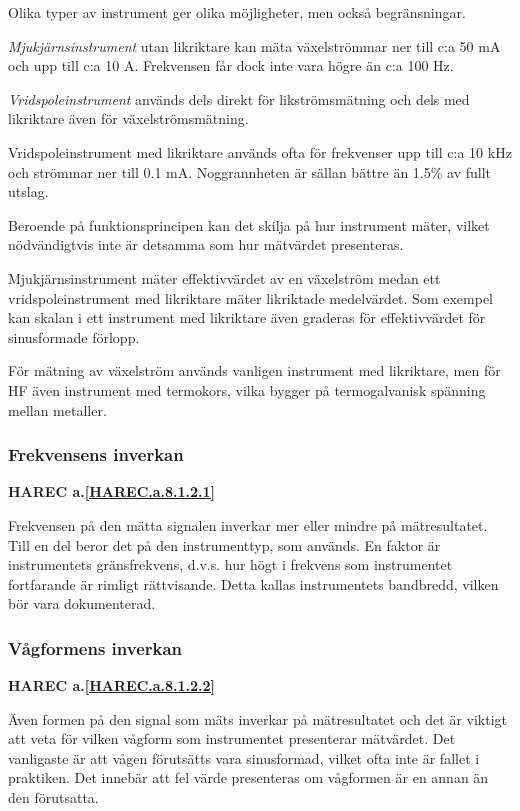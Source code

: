 Olika typer av instrument ger olika möjligheter, men också
begränsningar.

\emph{Mjukjärnsinstrument} utan likriktare kan mäta växelströmmar ner
till c:a 50 mA och upp till c:a 10 A. Frekvensen får dock inte vara
högre än c:a 100 Hz.

\emph{Vridspoleinstrument} används dels direkt för likströmsmätning
och dels med likriktare även för växelströmsmätning.

Vridspoleinstrument med likriktare används ofta för frekvenser upp
till c:a 10 kHz och strömmar ner till 0.1 mA. Noggrannheten är sällan
bättre än 1.5\% av fullt utslag.

Beroende på funktionsprincipen kan det skilja på hur instrument mäter,
vilket nödvändigtvis inte är detsamma som hur mätvärdet presenteras.

Mjukjärnsinstrument mäter effektivvärdet av en växelström medan ett
vridspoleinstrument med likriktare mäter likriktade medelvärdet. Som
exempel kan skalan i ett instrument med likriktare även graderas för
effektivvärdet för sinusformade förlopp.

För mätning av växelström används vanligen instrument med likriktare,
men för HF även instrument med termokors, vilka bygger på
termogalvanisk spänning mellan metaller.

\subsubsection{Frekvensens inverkan}
\textbf{
HAREC a.\ref{HAREC.a.8.1.2.1}\label{myHAREC.a.8.1.2.1}
}

Frekvensen på den mätta signalen inverkar mer eller mindre på
mätresultatet. Till en del beror det på den instrumenttyp, som
används. En faktor är instrumentets gränsfrekvens, d.v.s. hur högt i
frekvens som instrumentet fortfarande är rimligt rättvisande. Detta
kallas instrumentets bandbredd, vilken bör vara dokumenterad.

\subsubsection{Vågformens inverkan}
\textbf{
HAREC a.\ref{HAREC.a.8.1.2.2}\label{myHAREC.a.8.1.2.2}
}

Även formen på den signal som mäts inverkar på mätresultatet och det
är viktigt att veta för vilken vågform som instrumentet presenterar
mätvärdet. Det vanligaste är att vågen förutsätts vara sinusformad,
vilket ofta inte är fallet i praktiken. Det innebär att fel värde
presenteras om vågformen är en annan än den förutsatta.

